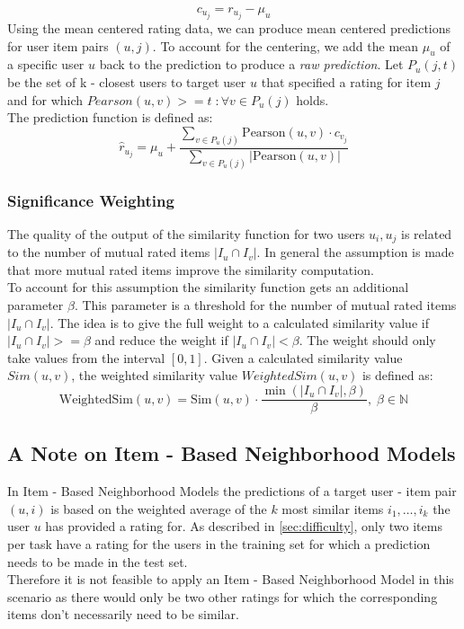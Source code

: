 \begin{equation}
    c_{u_j} = r_{u_j} - \mu_u
\end{equation}
Using the mean centered rating data, we can produce mean centered predictions for user item pairs $(u,j)$. To account for the centering, we add the mean $\mu_u$ of a specific user $u$ back to the prediction to produce a \textit{raw prediction}. Let $P_u(j,t)$ be the set of k - closest users to target user $u$ that specified a rating for item $j$ and for which $Pearson(u, v) >= t\;: \forall{v} \in P_u(j)$ holds.\\ The prediction function is defined as: 
\begin{equation}
    \hat{r}_{u_j} = \mu_u + \frac{\sum\limits_{v \in P_u(j)}\text{Pearson}(u, v) \cdot c_{v_j}}{\sum\limits_{v \in P_u(j)} |\text{Pearson}(u, v)|}
\end{equation}

\subsubsection{Significance Weighting}

The quality of the output of the similarity function for two users $u_i , u_j$ is related to the number of mutual rated items $|I_u \cap I_v|$. In general the assumption is made that more mutual rated items improve the similarity computation.\\
To account for this assumption the similarity function gets an additional parameter $\beta$. This parameter is a threshold for the number of mutual rated items $|I_u \cap I_v|$. The idea is to give the full weight to a calculated similarity value if $|I_u \cap I_v| >= \beta$ and reduce the weight if $|I_u \cap I_v| < \beta$. The weight should only take values from the interval $[0, 1]$. Given a calculated similarity value $Sim(u,v)$, the weighted similarity value $WeightedSim(u,v)$ is defined as:
\begin{equation}
    \text{WeightedSim}(u,v) = \text{Sim}(u,v) \cdot \frac{\min(|I_u \cap I_v|, \beta)}{\beta}, \;\beta \in \mathbb{N}
\end{equation}

\subsection{A Note on Item - Based Neighborhood Models}
In Item - Based Neighborhood Models the predictions of a target user - item pair $(u, i)$ is based on the weighted average of the $k$ most similar items $i_1,\dots,i_k$ the user $u$ has provided a rating for. As described in \ref{sec:difficulty}, only two items per task have a rating for the users in the training set for which a prediction needs to be made in the test set.\\
Therefore it is not feasible to apply an Item - Based Neighborhood Model in this scenario as there would only be two other ratings for which the corresponding items don't necessarily need to be similar.

